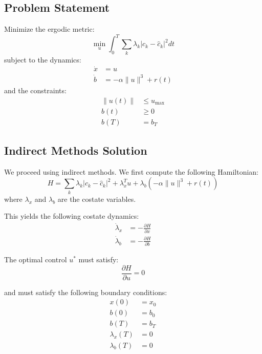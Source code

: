 \subsection{Problem Statement}
Minimize the ergodic metric:
\begin{equation}
    \min_u \int_0^T \sum_k \lambda_k \left| c_k - \hat{c}_k \right|^2 dt
\end{equation}
subject to the dynamics:
\begin{align}
    \dot{x} &= u \\
    \dot{b} &= - \alpha \|u\|^3 + r(t)
\end{align}
and the constraints:
\begin{align}
    \|u(t)\| &\leq u_{\max} \\
    b(t) &\geq 0 \\
    b(T) &= b_T
\end{align}

\subsection{Indirect Methods Solution}
We proceed using indirect methods. We first compute the following Hamiltonian:
\begin{equation}
   H = \sum_k \lambda_k \left| c_k - \hat{c}_k \right|^2 + \lambda_x^T u + \lambda_{b} \left( - \alpha \|u\|^3 + r(t) \right)
\end{equation}
where $\lambda_x$ and $\lambda_{b}$ are the costate variables.

This yields the following costate dynamics:
\begin{align}
   \dot{\lambda}_x &= -\frac{\partial H}{\partial x} \\
   \dot{\lambda}_{b} &= -\frac{\partial H}{\partial b}
\end{align}
   
The optimal control $u^*$ must satisfy:
\begin{equation}
   \frac{\partial H}{\partial u} = 0
\end{equation}

and must satisfy the following boundary conditions:
\begin{align}
   x(0) &= x_0 \\
   b(0) &= b_0 \\
   b(T) &= b_T \\
   \lambda_x(T) &= 0 \\
   \lambda_{b}(T) &= 0
\end{align}

